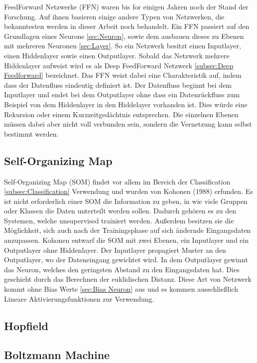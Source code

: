 FeedForward Netzwerke (FFN) waren bis for einigen Jahren noch der Stand der Forschung.
Auf ihnen basieren einige andere Typen von Netzwerken, die bekanntesten werden in dieser Arbeit noch behandelt.
Ein FFN passiert auf den Grundlagen eines Neurons \ref{sec:Neuron}, sowie dem ausbauen dieses zu Ebenen mit mehreren Neuronen \ref{sec:Layer}.
So ein Netzwerk besitzt einen Inputlayer, einen Hiddenlayer sowie einen Outputlayer.
Sobald das Netzwerk mehrere Hiddenlayer aufweist wird es als Deep FeedForward Netzwerk \ref{subsec:Deep Feedforward} bezeichnet.
Das FFN weist dabei eine Charakteristik auf, indem dass der Datenfluss eindeutig definiert ist. 
Der Datenfluss beginnt bei dem Inputlayer und endet bei dem Outputlayer ohne dass ein Datenrückfluss zum Beispiel von dem Hiddenlayer in den Hiddelayer vorhanden ist.
Dies würde eine Rekursion oder einem Kurzzeitgedächtnis entsprechen.
Die einzelnen Ebenen müssen dabei aber nicht voll verbunden sein, sondern die Vernetzung kann selbst bestimmt werden.

\subsection{Self-Organizing Map}

Self-Organizing Map (SOM) findet vor allem im Bereich der Classification  \ref{subsec:Classification} Verwendung und wurden von Kohonen (1988) erfunden. 
Es ist nicht erforderlich einer SOM die Information zu geben, in wie viele Gruppen oder Klassen die Daten unterteilt werden sollen. 
Dadurch gehören es zu den Systemen, welche unsupervised trainiert werden. 
Außerdem besitzen sie die Möglichkeit, sich auch nach der Trainingsphase auf sich ändernde Eingangsdaten anzupassen. 
Kohonen entwarf die SOM mit zwei Ebenen, ein Inputlayer und ein Outputlayer ohne Hiddenlayer. 
Der Inputlayer propagiert Muster an den Outputlayer, wo der Dateneingang gewichtet wird. 
In dem Outputlayer gewinnt das Neuron, welches den geringsten Abstand zu den Eingangsdaten hat.
Dies geschieht durch das Berechnen der euklidischen Distanz. 
Diese Art von Netzwerk kommt ohne Bias Werte \ref{sec:Bias Neuron} aus und es kommen ausschließlich Lineare Aktivierungsfunktionen zur Verwendung.



\subsection{Hopfield}

\subsection{Boltzmann Machine}

